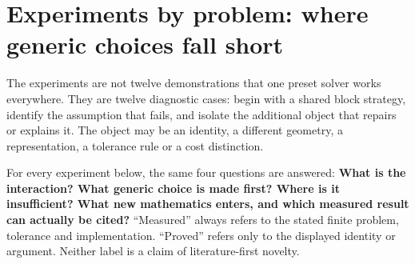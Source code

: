 \section{Experiments by problem: where generic choices fall short}
\label{sec:experiments}

The experiments are not twelve demonstrations that one preset solver works everywhere. They are twelve diagnostic cases: begin with a shared block strategy, identify the assumption that fails, and isolate the additional object that repairs or explains it. The object may be an identity, a different geometry, a representation, a tolerance rule or a cost distinction.

For every experiment below, the same four questions are answered: \textbf{What is the interaction? What generic choice is made first? Where is it insufficient? What new mathematics enters, and which measured result can actually be cited?} ``Measured'' always refers to the stated finite problem, tolerance and implementation. ``Proved'' refers only to the displayed identity or argument. Neither label is a claim of literature-first novelty.


